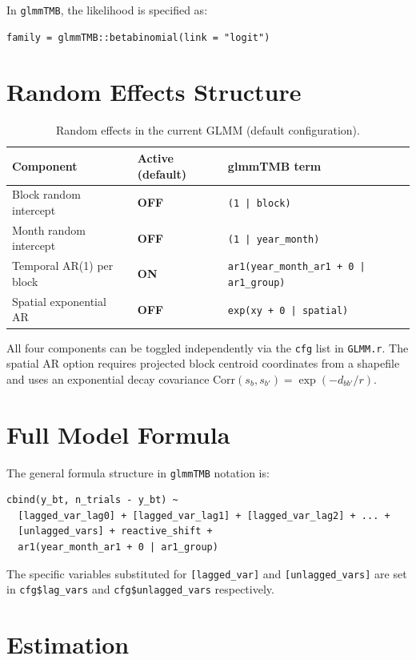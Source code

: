 \documentclass[12pt,a4paper]{article}
\begin{document}
In \texttt{glmmTMB}, the likelihood is specified as:
\begin{verbatim}
family = glmmTMB::betabinomial(link = "logit")
\end{verbatim}

\section{Random Effects Structure}

\begin{table}[ht]
\centering
\small
\begin{tabular}{lll}
\toprule
\textbf{Component} & \textbf{Active (default)} & \textbf{glmmTMB term} \\
\midrule
Block random intercept & \textbf{OFF} & \texttt{(1 | block)} \\
Month random intercept & \textbf{OFF} & \texttt{(1 | year\_month)} \\
Temporal AR(1) per block & \textbf{ON} & \texttt{ar1(year\_month\_ar1 + 0 | ar1\_group)} \\
Spatial exponential AR  & \textbf{OFF} & \texttt{exp(xy + 0 | spatial)} \\
\bottomrule
\end{tabular}
\caption{Random effects in the current GLMM (default configuration).}
\end{table}

\noindent All four components can be toggled independently via the \texttt{cfg} list in \texttt{GLMM.r}. The spatial AR option requires projected block centroid coordinates from a shapefile and uses an exponential decay covariance $\text{Corr}(s_b, s_{b'}) = \exp(-d_{bb'}/r)$.

\section{Full Model Formula}

The general formula structure in \texttt{glmmTMB} notation is:
\begin{verbatim}
cbind(y_bt, n_trials - y_bt) ~
  [lagged_var_lag0] + [lagged_var_lag1] + [lagged_var_lag2] + ... +
  [unlagged_vars] + reactive_shift +
  ar1(year_month_ar1 + 0 | ar1_group)
\end{verbatim}
The specific variables substituted for \texttt{[lagged\_var]} and \texttt{[unlagged\_vars]} are set in \texttt{cfg\$lag\_vars} and \texttt{cfg\$unlagged\_vars} respectively.

\section{Estimation}
\end{document}
